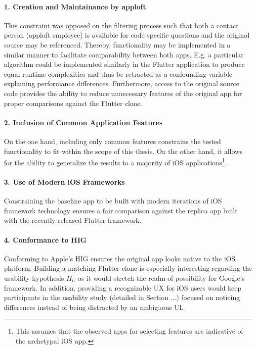 \paragraph*{1. Creation and Maintainance by apploft}\hfill \break
This constraint was opposed on the filtering process such that both a contact person (apploft employee)
is available for code specific questions and the original source may be referenced. Thereby, functionality may be implemented in a similar manner to facilitate comparability between both apps.
E.g. a particular algorithm could be implemented similarly in the Flutter application to produce equal runtime complexities and thus be retracted as a confounding variable 
explaining performance differences.
Furthermore, access to the original source code provides the ability to reduce unnecessary features of the original app for proper comparisons against the Flutter clone.

\paragraph*{2. Inclusion of Common Application Features}\hfill \break
On the one hand, including only common features constrains the tested functionality to fit within the scope of this thesis. On the other hand, it allows for
the ability to generalize the results to a majority of iOS applications\footnote{This assumes that the observed apps for selecting features are indicative of the archetypal iOS app.}.


\paragraph*{3. Use of Modern iOS Frameworks}\hfill \break
Constraining the baseline app to be built with modern iterations of iOS framework technology ensures a fair comparison 
against the replica app built with the recently released Flutter framework.


\paragraph*{4. Conformance to HIG}\hfill \break
Conforming to Apple's HIG ensures the original app looks native to the iOS platform. Building a matching Flutter clone is especially 
interesting regarding the usability hypothesis $H_U$ as it would stretch the realm of possibility for Google's framework.
In addition, providing a recognizable UX for iOS users would keep participants in the usability study (detailed in Section ...) focused on noticing differences instead of 
being distracted by an ambiguous UI.\\
\hfill \break
\hfill \break


